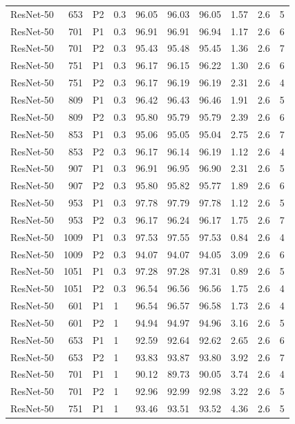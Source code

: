 {\begin{longtable}{lrllrrrrrr}
ResNet-50 & 653 & P2 & 0.3 & 96.05 & 96.03 & 96.05 & 1.57 & 2.6 & 5 \\
ResNet-50 & 701 & P1 & 0.3 & 96.91 & 96.91 & 96.94 & 1.17 & 2.6 & 6 \\
ResNet-50 & 701 & P2 & 0.3 & 95.43 & 95.48 & 95.45 & 1.36 & 2.6 & 7 \\
ResNet-50 & 751 & P1 & 0.3 & 96.17 & 96.15 & 96.22 & 1.30 & 2.6 & 6 \\
ResNet-50 & 751 & P2 & 0.3 & 96.17 & 96.19 & 96.19 & 2.31 & 2.6 & 4 \\
ResNet-50 & 809 & P1 & 0.3 & 96.42 & 96.43 & 96.46 & 1.91 & 2.6 & 5 \\
ResNet-50 & 809 & P2 & 0.3 & 95.80 & 95.79 & 95.79 & 2.39 & 2.6 & 6 \\
ResNet-50 & 853 & P1 & 0.3 & 95.06 & 95.05 & 95.04 & 2.75 & 2.6 & 7 \\
ResNet-50 & 853 & P2 & 0.3 & 96.17 & 96.14 & 96.19 & 1.12 & 2.6 & 4 \\
ResNet-50 & 907 & P1 & 0.3 & 96.91 & 96.95 & 96.90 & 2.31 & 2.6 & 5 \\
ResNet-50 & 907 & P2 & 0.3 & 95.80 & 95.82 & 95.77 & 1.89 & 2.6 & 6 \\
ResNet-50 & 953 & P1 & 0.3 & 97.78 & 97.79 & 97.78 & 1.12 & 2.6 & 5 \\
ResNet-50 & 953 & P2 & 0.3 & 96.17 & 96.24 & 96.17 & 1.75 & 2.6 & 7 \\
ResNet-50 & 1009 & P1 & 0.3 & 97.53 & 97.55 & 97.53 & 0.84 & 2.6 & 4 \\
ResNet-50 & 1009 & P2 & 0.3 & 94.07 & 94.07 & 94.05 & 3.09 & 2.6 & 6 \\
ResNet-50 & 1051 & P1 & 0.3 & 97.28 & 97.28 & 97.31 & 0.89 & 2.6 & 5 \\
ResNet-50 & 1051 & P2 & 0.3 & 96.54 & 96.56 & 96.56 & 1.75 & 2.6 & 4 \\
ResNet-50 & 601 & P1 & 1 & 96.54 & 96.57 & 96.58 & 1.73 & 2.6 & 4 \\
ResNet-50 & 601 & P2 & 1 & 94.94 & 94.97 & 94.96 & 3.16 & 2.6 & 5 \\
ResNet-50 & 653 & P1 & 1 & 92.59 & 92.64 & 92.62 & 2.65 & 2.6 & 6 \\
ResNet-50 & 653 & P2 & 1 & 93.83 & 93.87 & 93.80 & 3.92 & 2.6 & 7 \\
ResNet-50 & 701 & P1 & 1 & 90.12 & 89.73 & 90.05 & 3.74 & 2.6 & 4 \\
ResNet-50 & 701 & P2 & 1 & 92.96 & 92.99 & 92.98 & 3.22 & 2.6 & 5 \\
ResNet-50 & 751 & P1 & 1 & 93.46 & 93.51 & 93.52 & 4.36 & 2.6 & 5 \\

\end{longtable}}
